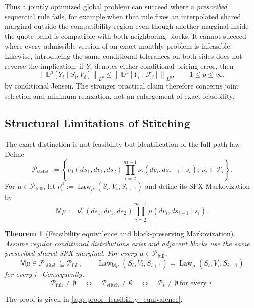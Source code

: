 \documentclass{article}
\newtheorem{theorem}{Theorem}[section]
\DeclareMathOperator{\Law}{Law}
\newcommand{\cF}{\mathcal{F}}
\newcommand{\cP}{\mathcal{P}}
\newcommand{\Embb}{\mathbb{E}}
\begin{document}
Thus a jointly optimized global problem can succeed where a \emph{prescribed} sequential rule fails, for example when that rule fixes an interpolated shared marginal outside the compatibility region even though another marginal inside the quote band is compatible with both neighboring blocks.
It cannot succeed where every admissible version of an exact monthly problem is infeasible.
Likewise, introducing the same conditional tolerances on both sides does not reverse the implication: if $Y_i$ denotes either conditional pricing error, then
\[
\left\|\Embb^\mu[Y_i\mid S_i,V_i]\right\|_{L^p}
\leq
\left\|\Embb^\mu[Y_i\mid\cF_i]\right\|_{L^p},
\qquad 1\leq p\leq\infty,
\]
by conditional Jensen.
The stronger practical claim therefore concerns joint selection and minimum relaxation, not an enlargement of exact feasibility.

\subsection{Structural Limitations of Stitching}\label{subsec:stitching_limits}

The exact distinction is not feasibility but identification of the full path law.
Define
\begin{equation}\label{eq:stitched_class}
\cP_{\mathrm{stitch}}
:=
\left\{
\nu_1(ds_1,dv_1,ds_2)
\prod_{i=2}^{m-1}\nu_i(dv_i,ds_{i+1}\mid s_i)
:\ \nu_i\in\cP_i
\right\}.
\end{equation}
For $\mu\in\cP_{\mathrm{full}}$, let $\nu_i^\mu:=\Law_\mu(S_i,V_i,S_{i+1})$ and define its SPX-Markovization by
\begin{equation}\label{eq:markovization}
\mathsf M\mu
:=
\nu_1^\mu(ds_1,dv_1,ds_2)
\prod_{i=2}^{m-1}\mu(dv_i,ds_{i+1}\mid s_i).
\end{equation}

\begin{theorem}[Feasibility equivalence and block-preserving Markovization]
\label{thm:feasibility_equivalence}
Assume regular conditional distributions exist and adjacent blocks use the same prescribed shared SPX marginal.
For every $\mu\in\cP_{\mathrm{full}}$,
\begin{equation}\label{eq:block_preservation}
    \mathsf M\mu\in\cP_{\mathrm{stitch}}\subseteq\cP_{\mathrm{full}},
    \qquad
    \Law_{\mathsf M\mu}(S_i,V_i,S_{i+1})
    =\Law_\mu(S_i,V_i,S_{i+1})
\end{equation}
for every $i$.
Consequently,
\begin{equation}\label{eq:feasibility_equivalence}
\cP_{\mathrm{full}}\neq\emptyset
\quad\Longleftrightarrow\quad
\cP_{\mathrm{stitch}}\neq\emptyset
\quad\Longleftrightarrow\quad
\cP_i\neq\emptyset\ \text{for every }i.
\end{equation}
\end{theorem}
The proof is given in \cref{app:proof_feasibility_equivalence}.
\end{document}

